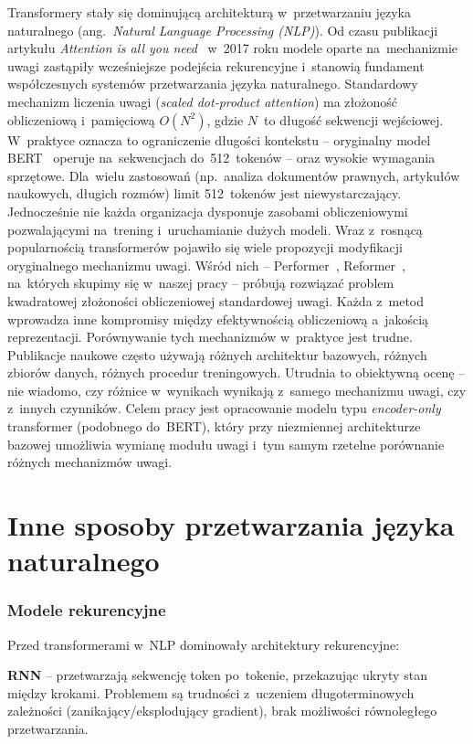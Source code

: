 \documentclass[a4paper,11pt,twoside]{report}
\theoremstyle{definition}
\begin{document}
Transformery stały się dominującą architekturą w~przetwarzaniu języka naturalnego (ang.\ \emph{Natural Language Processing (NLP)}). Od czasu publikacji artykułu \textit{Attention is all you need}~\cite{vaswani2017attention} w~2017 roku modele oparte na~mechanizmie uwagi zastąpiły wcześniejsze podejścia rekurencyjne i~stanowią fundament współczesnych systemów przetwarzania języka naturalnego. Standardowy mechanizm liczenia uwagi (\emph{scaled dot-product attention}) ma złożoność obliczeniową i~pamięciową $O(N^2)$, gdzie $N$~to długość sekwencji wejściowej. W~praktyce oznacza to ograniczenie długości kontekstu -- oryginalny model BERT~\cite{devlin2019bert} operuje na~sekwencjach do~512~tokenów -- oraz wysokie wymagania sprzętowe. Dla~wielu zastosowań (np.\ analiza dokumentów prawnych, artykułów naukowych, długich rozmów) limit 512~tokenów jest niewystarczający. Jednocześnie nie każda organizacja dysponuje zasobami obliczeniowymi pozwalającymi na~trening i~uruchamianie dużych modeli. Wraz z~rosnącą popularnością transformerów pojawiło się wiele propozycji modyfikacji oryginalnego mechanizmu uwagi. Wśród nich -- Performer~\cite{choromanski2021rethinking}, Reformer~\cite{Kitaev2020Reformer:}, na~których skupimy się w~naszej pracy -- próbują rozwiązać problem kwadratowej złożoności obliczeniowej standardowej uwagi. Każda z~metod wprowadza inne kompromisy między efektywnością obliczeniową a~jakością reprezentacji. Porównywanie tych mechanizmów w~praktyce jest trudne. Publikacje naukowe często używają różnych architektur bazowych, różnych zbiorów danych, różnych procedur treningowych. Utrudnia to obiektywną ocenę -- nie wiadomo, czy różnice w~wynikach wynikają z~samego mechanizmu uwagi, czy z~innych czynników. Celem pracy jest opracowanie modelu typu \emph{encoder-only} transformer (podobnego do~BERT), który przy niezmiennej architekturze bazowej umożliwia wymianę modułu uwagi i~tym samym rzetelne porównanie różnych mechanizmów uwagi. 


\section{Inne sposoby przetwarzania języka naturalnego}

\subsubsection{Modele rekurencyjne}
Przed transformerami w~NLP dominowały architektury rekurencyjne:

\textbf{RNN} -- przetwarzają sekwencję token po~tokenie, przekazując ukryty stan między krokami. Problemem są trudności z~uczeniem długoterminowych zależności (zanikający/eksplodujący gradient), brak możliwości równoległego przetwarzania.
\end{document}
